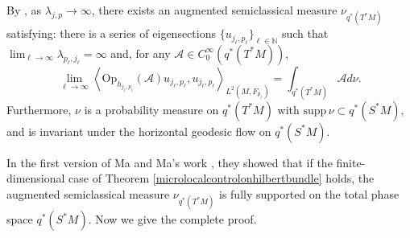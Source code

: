 \documentclass[11pt,oneside,reqno]{amsart}
\theoremstyle{definition}
\numberwithin{equation}{section}
\theoremstyle{plain}
\begin{document}
By \cite[Proposition 5.2]{mama2024semiclassical}, as $\lambda_{j,p}\to \infty$, there exists an augmented semiclassical measure $\nu_{q^*(T^*M)}$ satisfying: there is a series of eigensections $\{u_{j_{\ell},p_{\ell}}\}_{\ell \in \mathbb{N}}$ such that $\lim_{\ell \rightarrow \infty} \lambda_{p_{\ell}, j_{\ell}}=\infty$ and, for any $\mathcal{A} \in C^{\infty}_{0}(q^*(T^* M))$,
\begin{equation*}
    \lim _{\ell \rightarrow \infty}\left\langle\mathrm{Op}_{h_{ j_{\ell},p_{\ell}}}(\mathcal{A}) u_{j_{\ell},p_{\ell}}, u_{j_{\ell},p_{\ell}}\right\rangle_{L^2\left(M, F_{p_{\ell}}\right)}=\int_{q^*\left(T^* M\right)} \mathcal{A} d \nu.
\end{equation*}
Furthermore, $\nu$ is a probability measure on $q^*(T^*M)$ with $\mathrm{supp}\,\nu\subset q^*(S^*M)$, and is invariant under the horizontal geodesic flow on $ q^*(S^*M)$.

In the first version of Ma and Ma's work \cite{mama2024semiclassical}, they showed that if the finite-dimensional case of Theorem \ref{microlocalcontrolonhilbertbundle} holds, the augmented semiclassical measure $\nu_{q^*\left(T^*M\right)}$ is fully supported on the total phase space $q^*(S^*M)$. Now we give the complete proof.
\end{document}
